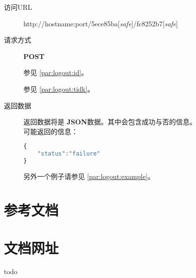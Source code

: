 \documentclass[UTF8]{ctexart}
\def\safe{[\textit{safe}]}
\def\POST{\textbf{POST}}
\def\bfJSON{\textbf{JSON}}
\begin{document}
        
        
        
        
        \begin{description}
            \item[访问URL] http://hostname:port/5ece85ba\safe/fc8252b7\safe
            
            \item[请求方式] \POST
            
            参见 \ref{par:logout:id}。
            
            参见 \ref{par:logout:tidk}。
            
            
            \item[返回数据] 返回数据将是 \bfJSON 数据。其中会包含成功与否的信息。
            \\可能返回的信息：
            \begin{lstlisting}[language=JavaScript]
{
    "status":"failure"
}
            \end{lstlisting}
            另外一个例子请参见 \ref{par:logout:example}。
        \end{description}
        
        
        
        
        
        
        
     
    \newpage
    \begin{appendices}
    \section{参考文档}
    \section{文档网址}
    todo 
    \end{appendices}
    
\end{document}
